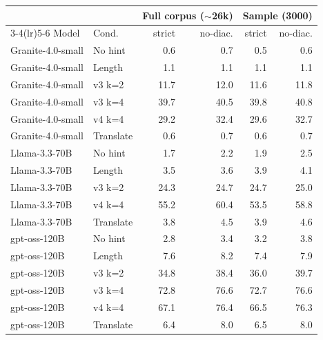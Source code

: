 \begin{tabular}{llrrrr}
\toprule
 & & \multicolumn{2}{c}{Full corpus ($\sim$26k)} & \multicolumn{2}{c}{Sample (3000)} \\
\cmidrule(lr){3-4}\cmidrule(lr){5-6}
Model & Cond. & strict & no-diac. & strict & no-diac. \\
\midrule
Granite-4.0-small & No hint & 0.6 & 0.7 & 0.5 & 0.6 \\
Granite-4.0-small & Length & 1.1 & 1.1 & 1.1 & 1.1 \\
Granite-4.0-small & v3 k=2 & 11.7 & 12.0 & 11.6 & 11.8 \\
Granite-4.0-small & v3 k=4 & 39.7 & 40.5 & 39.8 & 40.8 \\
Granite-4.0-small & v4 k=4 & 29.2 & 32.4 & 29.6 & 32.7 \\
Granite-4.0-small & Translate & 0.6 & 0.7 & 0.6 & 0.7 \\
\addlinespace
Llama-3.3-70B & No hint & 1.7 & 2.2 & 1.9 & 2.5 \\
Llama-3.3-70B & Length & 3.5 & 3.6 & 3.9 & 4.1 \\
Llama-3.3-70B & v3 k=2 & 24.3 & 24.7 & 24.7 & 25.0 \\
Llama-3.3-70B & v4 k=4 & 55.2 & 60.4 & 53.5 & 58.8 \\
Llama-3.3-70B & Translate & 3.8 & 4.5 & 3.9 & 4.6 \\
\addlinespace
gpt-oss-120B & No hint & 2.8 & 3.4 & 3.2 & 3.8 \\
gpt-oss-120B & Length & 7.6 & 8.2 & 7.4 & 7.9 \\
gpt-oss-120B & v3 k=2 & 34.8 & 38.4 & 36.0 & 39.7 \\
gpt-oss-120B & v3 k=4 & 72.8 & 76.6 & 72.7 & 76.6 \\
gpt-oss-120B & v4 k=4 & 67.1 & 76.4 & 66.5 & 76.3 \\
gpt-oss-120B & Translate & 6.4 & 8.0 & 6.5 & 8.0 \\
\bottomrule
\end{tabular}
